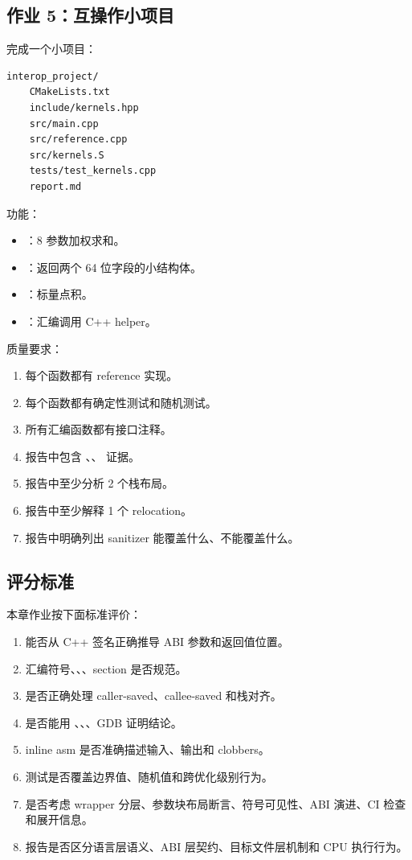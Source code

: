 \begin{exercisebox}
\subsection*{作业 5：互操作小项目}

完成一个小项目：

\begin{lstlisting}
interop_project/
    CMakeLists.txt
    include/kernels.hpp
    src/main.cpp
    src/reference.cpp
    src/kernels.S
    tests/test_kernels.cpp
    report.md
\end{lstlisting}

功能：

\begin{itemize}
  \item {}：8 参数加权求和。
  \item {}：返回两个 64 位字段的小结构体。
  \item {}：标量点积。
  \item {}：汇编调用 C++ helper。
\end{itemize}

质量要求：

\begin{enumerate}
  \item 每个函数都有 reference 实现。
  \item 每个函数都有确定性测试和随机测试。
  \item 所有汇编函数都有接口注释。
  \item 报告中包含 、、 证据。
  \item 报告中至少分析 2 个栈布局。
  \item 报告中至少解释 1 个 relocation。
  \item 报告中明确列出 sanitizer 能覆盖什么、不能覆盖什么。
\end{enumerate}

\subsection*{评分标准}

本章作业按下面标准评价：

\begin{enumerate}
  \item 能否从 C++ 签名正确推导 ABI 参数和返回值位置。
  \item 汇编符号、、、section 是否规范。
  \item 是否正确处理 caller-saved、callee-saved 和栈对齐。
  \item 是否能用 、、、GDB 证明结论。
  \item inline asm 是否准确描述输入、输出和 clobbers。
  \item 测试是否覆盖边界值、随机值和跨优化级别行为。
  \item 是否考虑 wrapper 分层、参数块布局断言、符号可见性、ABI 演进、CI 检查和展开信息。
  \item 报告是否区分语言层语义、ABI 层契约、目标文件层机制和 CPU 执行行为。
\end{enumerate}
\end{exercisebox}


